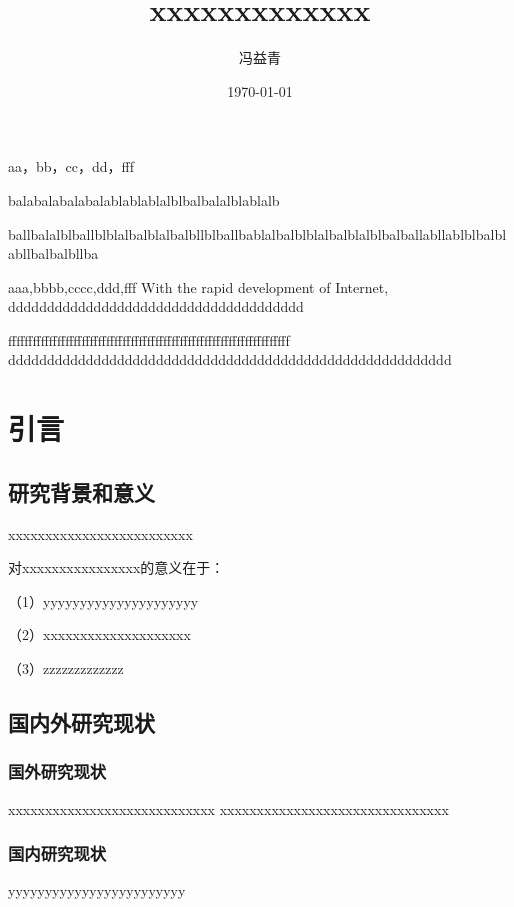 \documentclass{cqupt}
\title{xxxxxxxxxxxxx} %
\author{冯益青} %
\date{\today} %
\begin{document}
\maketitle
\makestatement
{} %
\begin{cnabstract}{aa，bb，cc，dd，fff}

balabalabalabalablablablalblbalbalalblablalb

ballbalalblballblblalbalblalbalbllblballbablalbalblblalbalblalblbalballabllablblbalblabllbalbalbllba

		
\end{cnabstract}
\begin{enabstract}{aaa,bbbb,cccc,ddd,fff}
With the rapid development of Internet, dddddddddddddddddddddddddddddddddddddd

fffffffffffffffffffffffffffffffffffffffffffffffffffffffffffffffffffff
ddddddddddddddddddddddddddddddddddddddddddddddddddddddddd
\end{enabstract}

\tableofcontents

	
\clearpage
\chapter{引言}
\section{研究背景和意义}
xxxxxxxxxxxxxxxxxxxxxxxxx

对xxxxxxxxxxxxxxxx的意义在于：

（1）yyyyyyyyyyyyyyyyyyyyy

（2）xxxxxxxxxxxxxxxxxxxx

（3）zzzzzzzzzzzzz

\section{国内外研究现状}
\subsection{国外研究现状}
xxxxxxxxxxxxxxxxxxxxxxxxxxxx
xxxxxxxxxxxxxxxxxxxxxxxxxxxxxxx
\subsection{国内研究现状}
yyyyyyyyyyyyyyyyyyyyyyyy
\end{document}
